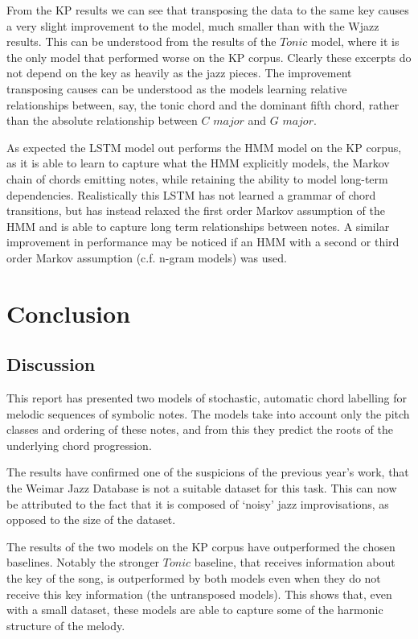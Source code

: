 \documentclass[bsc,singlespacing,logo, parskip, deptreport]{infthesis}
\begin{document}
From the KP results we can see that transposing the data to the same key causes a very slight improvement to the model, much smaller than with the Wjazz results. This can be understood from the results of the $Tonic$ model, where it is the only model that performed worse on the KP corpus. Clearly these excerpts do not depend on the key as heavily as the jazz pieces. The improvement transposing causes can be understood as the models learning relative relationships between, say, the tonic chord and the dominant fifth chord, rather than the absolute relationship between $C$ $major$ and $G$ $major$.

As expected the LSTM model out performs the HMM model on the KP corpus, as it is able to learn to capture what the HMM explicitly models, the Markov chain of chords emitting notes, while retaining the ability to model long-term dependencies. Realistically this LSTM has not learned a grammar of chord transitions, but has instead relaxed the first order Markov assumption of the HMM and is able to capture long term relationships between notes. A similar improvement in performance may be noticed if an HMM with a second or third order Markov assumption (c.f. n-gram models) was used.

\chapter{Conclusion}

\section{Discussion}

This report has presented two models of stochastic, automatic chord labelling for melodic sequences of symbolic notes. The models take into account only the pitch classes and ordering of these notes, and from this they predict the roots of the underlying chord progression.

The results have confirmed one of the suspicions of the previous year's work, that the Weimar Jazz Database is not a suitable dataset for this task. This can now be attributed to the fact that it is composed of `noisy' jazz improvisations, as opposed to the size of the dataset.

The results of the two models on the KP corpus have outperformed the chosen baselines. Notably the stronger $Tonic$ baseline, that receives information about the key of the song, is outperformed by both models even when they do not receive this key information (the untransposed models). This shows that, even with a small dataset, these models are able to capture some of the harmonic structure of the melody.
\end{document}
